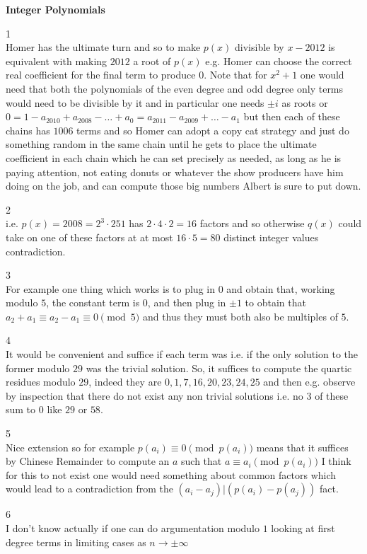 \newpage

\textbf{Integer Polynomials}

1 \\
Homer has the ultimate turn and so to make $p(x)$ divisible by $x-2012$ is equivalent with making $2012$ a root of $p(x)$ e.g. Homer can choose the correct real coefficient for the final term to produce $0$. Note that for $x^2+1$ one would need that both the polynomials of the even degree and odd degree only terms would need to be divisible by it and in particular one needs $\pm i$ as roots or $0=1-a_{2010}+a_{2008}-\dots+a_0=a_{2011}-a_{2009}+\dots-a_1$ but then each of these chains has $1006$ terms and so Homer can adopt a copy cat strategy and just do something random in the same chain until he gets to place the ultimate coefficient in each chain which he can set precisely as needed, as long as he is paying attention, not eating donuts or whatever the show producers have him doing on the job, and can compute those big numbers Albert is sure to put down.

2 \\
i.e. $p(x)=2008=2^3 \cdot 251$ has $2\cdot 4\cdot 2=16$ factors and so otherwise $q(x)$ could take on one of these factors at at most $16\cdot 5=80$ distinct integer values contradiction.

3 \\
For example one thing which works is to plug in $0$ and obtain that, working modulo $5$, the constant term is $0$, and then plug in $\pm 1$ to obtain that $a_2+a_1 \equiv a_2-a_1 \equiv 0 \pmod{5}$ and thus they must both also be multiples of $5$.

4 \\
It would be convenient and suffice if each term was i.e. if the only solution to the former modulo $29$ was the trivial solution. So, it suffices to compute the quartic residues modulo $29$, indeed they are $0,1,7,16,20,23,24,25$ and then e.g. observe by inspection that there do not exist any non trivial solutions i.e. no $3$ of these sum to $0$ like $29$ or $58$.

5 \\
Nice extension so for example $p(a_i) \equiv 0 \pmod{p(a_i)}$ means that it suffices by Chinese Remainder to compute an $a$ such that $a \equiv a_i \pmod{p(a_i)}$ I think for this to not exist one would need something about common factors which would lead to a contradiction from the $(a_i-a_j)|(p(a_i)-p(a_j))$ fact.

6 \\
I don't know actually if one can do argumentation modulo $1$ looking at first degree terms in limiting cases as $n \to \pm \infty$

